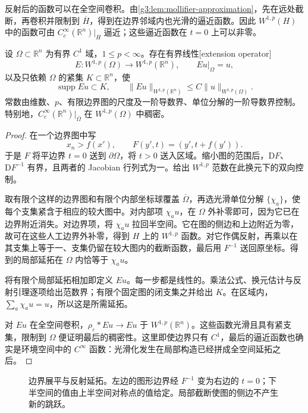 反射后的函数可以在全空间卷积。由\cref{g3:lem:mollifier-approximation}，先在远处截断，再卷积并限制到 \(\overline H\)，得到在边界邻域内也光滑的逼近函数。因此 \(W^{1,p}(H)\) 中的函数可由 \(C_c^\infty(\mathbb R^n)|_{\overline H}\) 逼近；这些逼近函数在 \(t=0\) 上可以非零。

\begin{theorem}\label{g3:thm:sobolev-extension-c1}
	设 \(\Omega\subset\mathbb R^n\) 为有界 \(C^1\) 域，\(1\le p<\infty\)。存在有界线性[extension operator]
	\[
		E:W^{1,p}(\Omega)\longrightarrow W^{1,p}(\mathbb R^n),
		\qquad Eu|_\Omega=u,
	\]
	以及只依赖 \(\Omega\) 的紧集 \(K\subset\mathbb R^n\)，使
	\[
		\operatorname{supp}Eu\subset K,\qquad
		\|Eu\|_{W^{1,p}(\mathbb R^n)}\le C\|u\|_{W^{1,p}(\Omega)}.
	\]
	常数由维数、\(p\)、有限边界图的尺度及一阶导数界、单位分解的一阶导数界控制。特别地，\(C_c^\infty(\mathbb R^n)|_{\overline\Omega}\) 在 \(W^{1,p}(\Omega)\) 中稠密。
\end{theorem}
\begin{proof}
	在一个边界图中写
	\[
		x_n>f(x'),\qquad
		F(y',t)=(y',t+f(y')).
	\]
	于是 \(F\) 将平边界 \(t=0\) 送到 \(\partial\Omega\)，将 \(t>0\) 送入区域。缩小图的范围后，\(\mathrm DF\)、\(\mathrm DF^{-1}\) 有界，且两者的 Jacobian 行列式为一。给出 \(W^{1,p}\) 范数在此换元下的双向控制。

	取有限个这样的边界图和有限个内部坐标球覆盖 \(\overline\Omega\)，再选光滑单位分解 \(\{\chi_a\}\)，使每个支集紧含于相应的较大图中。对内部项 \(\chi_a u\)，在 \(\Omega\) 外补零即可，因为它已在边界附近消失。对边界项，将 \(\chi_a u\) 拉回半空间。它在图的侧边和上边附近为零，故可在这些人工边界外补零，得到 \(H\) 上的 \(W^{1,p}\) 函数。对它作偶反射，再乘以在其支集上等于一、支集仍留在较大图内的截断函数，最后用 \(F^{-1}\) 送回原坐标。得到的局部延拓在 \(\Omega\) 内恰等于 \(\chi_a u\)。

	将有限个局部延拓相加即定义 \(Eu\)。每一步都是线性的。乘法公式、换元估计与反射引理逐项给出范数界；有限个固定图的闭支集之并给出 \(K\)。在区域内，\(\sum_a\chi_a u=u\)，所以这是所需延拓。

	对 \(Eu\) 在全空间卷积，\(\rho_\varepsilon*Eu\to Eu\) 于 \(W^{1,p}(\mathbb R^n)\)。这些函数光滑且具有紧支集，限制到 \(\Omega\) 便证明最后的稠密性。这里即使边界只有 \(C^1\)，最后的逼近函数也确实是环境空间中的 \(C^\infty\) 函数：光滑化发生在局部构造已经拼成全空间延拓之后。
\end{proof}

\begin{figure}[htbp]
	\centering
	
	\caption[边界展平与反射延拓]{边界展平与反射延拓。左边的图形边界经 \(F^{-1}\) 变为右边的 \(t=0\)；下半空间的值由上半空间对称点的值给定。局部截断使图的侧边不产生新的跳跃。}
	\label{g3:fig:boundary-extension}
\end{figure}

